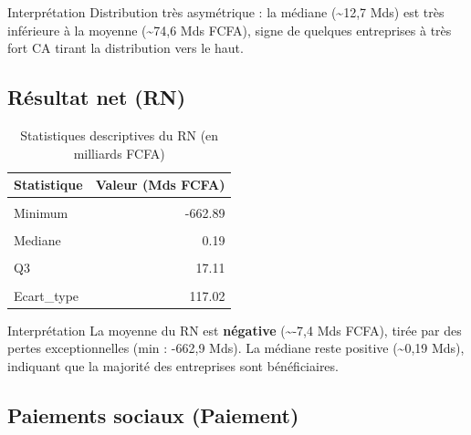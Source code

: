 \documentclass[
  12pt,
]{article}
\begin{document}
\begin{boiteresultat}{Interprétation}
Distribution très asymétrique : la médiane (\textasciitilde{}12,7 Mds) est très inférieure à la moyenne (\textasciitilde{}74,6 Mds FCFA), signe de quelques entreprises à très fort CA tirant la distribution vers le haut.
\end{boiteresultat}

\subsection{Résultat net (RN)}\label{ruxe9sultat-net-rn}

\begin{table}[!h]
\centering
\caption{\label{tab:stats-RN}Statistiques descriptives du RN (en milliards FCFA)}
\centering
\begin{tabular}[t]{lr}
\toprule
Statistique & Valeur (Mds FCFA)\\
\midrule
\cellcolor{gray!10}{N} & \cellcolor{gray!10}{91.00}\\
Minimum & -662.89\\
\cellcolor{gray!10}{Q1} & \cellcolor{gray!10}{-0.12}\\
Mediane & 0.19\\
\cellcolor{gray!10}{Moyenne} & \cellcolor{gray!10}{-7.36}\\
\addlinespace
Q3 & 17.11\\
\cellcolor{gray!10}{Maximum} & \cellcolor{gray!10}{230.17}\\
Ecart\_type & 117.02\\
\bottomrule
\end{tabular}
\end{table}

\begin{boiteattn}{Interprétation}
La moyenne du RN est \textbf{négative} (\textasciitilde{}-7,4 Mds FCFA), tirée par des pertes exceptionnelles (min : -662,9 Mds). La médiane reste positive (\textasciitilde{}0,19 Mds), indiquant que la majorité des entreprises sont bénéficiaires.
\end{boiteattn}

\subsection{Paiements sociaux (Paiement)}\label{paiements-sociaux-paiement}
\end{document}
